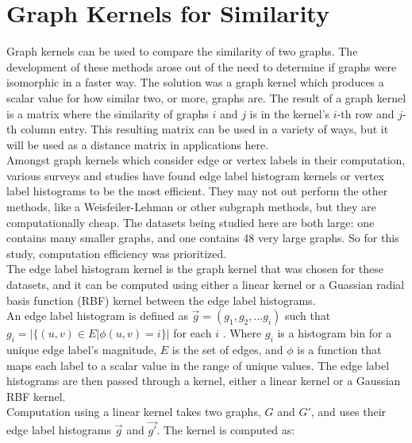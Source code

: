 %
%
%

\section{Graph Kernels for Similarity}

\hspace*{0.3cm} Graph kernels can be used to compare the similarity of two graphs. The development of these methods arose out of the need to determine if graphs were isomorphic in a faster way. The solution was a graph kernel which produces a scalar value for how similar two, or more, graphs are. The result of a graph kernel is a matrix where the similarity of graphs $i$ and $j$ is in the kernel's $i$-th row and $j$-th column entry. This resulting matrix can be used in a variety of ways, but it will be used as a distance matrix in applications here. \\

Amongst graph kernels which consider edge or vertex labels in their computation, various surveys and studies have found edge label histogram kernels or vertex label histograms to be the most efficient. They may not out perform the other methods, like a Weisfeiler-Lehman or other subgraph methods, but they are computationally cheap. The datasets being studied here are both large: one contains many smaller graphs, and one contains 48 very large graphs. So for this study, computation efficiency was prioritized. \\

The edge label histogram kernel is the graph kernel that was chosen for these datasets, and it can be computed using either a linear kernel or a Guassian radial basis function (RBF) kernel between the edge label histograms. \\
An edge label histogram is defined as $\vec{g} = (g_1,g_2, ... g_i)$ such that $g_i = | \{ (u,v) \in E | \phi(u,v) = i \} |$ for each $i$ \cite{sugiyama2015halting}. Where $g_i$ is a histogram bin for a unique edge label's magnitude, $E$ is the set of edges, and $\phi$ is a function that maps each label to a scalar value in the range of unique values. The edge label histograms are then passed through a kernel, either a linear kernel or a Gaussian RBF kernel.\\
Computation using a linear kernel takes two graphs, $G$ and $G'$, and uses their edge label histograms $\vec{g}$ and $\vec{g'}$. The kernel is computed as:

